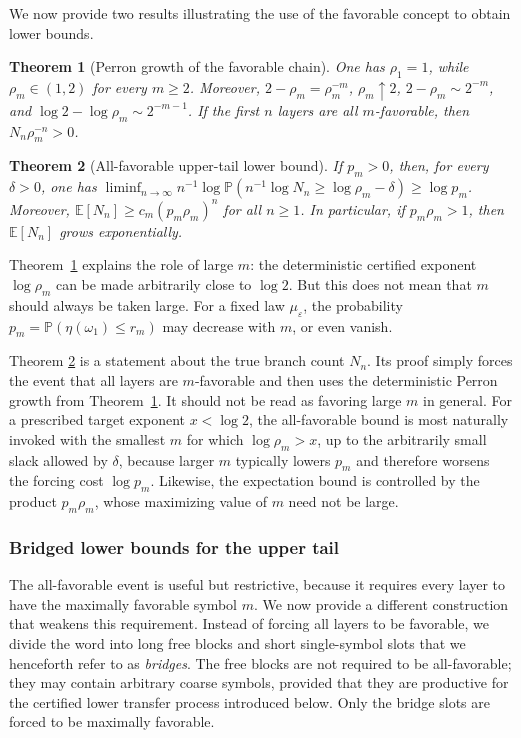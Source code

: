 \documentclass[11pt]{amsart}
\numberwithin{equation}{section}
\theoremstyle{plain}
\newtheorem{theorem}{Theorem}[section]
\theoremstyle{definition}
\theoremstyle{remark}
\begin{document}
We now provide two results illustrating the use of the favorable concept to obtain lower bounds.

\begin{theorem}[Perron growth of the favorable chain]\label{thm:main-perron}
	One has \(\rho_1=1\), while \(\rho_m\in(1,2)\) for every \(m\ge2\). Moreover, \(2-\rho_m=\rho_m^{-m}\), \(\rho_m\uparrow2\), \(2-\rho_m\sim2^{-m}\), and \(\log 2-\log\rho_m\sim2^{-m-1}\). If the first \(n\) layers are all \(m\)-favorable, then \(N_n\rho_m^{-n}>0\).
\end{theorem}



\begin{theorem}[All-favorable upper-tail lower bound]\label{thm:main-all-favorable}
If \(p_m>0\), then, for every \(\delta>0\), one has \(\liminf_{n\to\infty} n^{-1}\log\mathbb P(n^{-1}\log N_n\ge\log\rho_m-\delta)\ge \log p_m\). Moreover, \(\mathbb E[N_n]\ge c_m(p_m\rho_m)^n\) for all \(n\ge1\). In particular, if \(p_m\rho_m>1\), then \(\mathbb E[N_n]\) grows exponentially.
\end{theorem}
Theorem~\ref{thm:main-perron} explains the role of large \(m\): the deterministic certified exponent \(\log\rho_m\) can be made arbitrarily close to \(\log 2\). But this does not mean that \(m\) should always be taken large. For a fixed law \(\mu_\varepsilon\), the probability \(p_m=\mathbb P(\eta(\omega_1)\le r_m)\) may decrease with \(m\), or even vanish.

Theorem \ref{thm:main-all-favorable} is a statement about the true branch count \(N_n\). Its proof simply forces the event that all layers are \(m\)-favorable and then uses the deterministic Perron growth from Theorem~\ref{thm:main-perron}. It should not be read as favoring large \(m\) in general. For a prescribed target exponent \(x<\log 2\), the all-favorable bound is most naturally invoked with the smallest \(m\) for which \(\log\rho_m>x\), up to the arbitrarily small slack allowed by \(\delta\), because larger \(m\) typically lowers \(p_m\) and therefore worsens the forcing cost \(\log p_m\). Likewise, the expectation bound is controlled by the product \(p_m\rho_m\), whose maximizing value of \(m\) need not be large.

\subsubsection{Bridged lower bounds for the upper tail}\label{subsubsec:bridged-lower-main}

The all-favorable event is useful but restrictive, because it requires every layer to have the maximally favorable symbol \(m\). 
We now provide a different construction that weakens this requirement. Instead of forcing all layers to be favorable, we divide the word into long free blocks and short single-symbol slots that we henceforth refer to as  \emph{bridges}. The free blocks are not required to be all-favorable; they may contain arbitrary coarse symbols, provided that they are productive for the certified lower transfer process introduced below. Only the bridge slots are forced to be maximally favorable.
\end{document}
